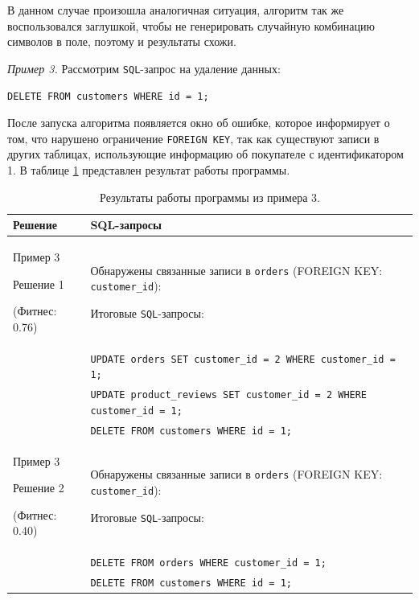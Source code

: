 \documentclass[master,paper]{pmk-graduate}
\begin{document}
В данном случае произошла аналогичная ситуация, алгоритм так же воспользовался заглушкой, чтобы не генерировать случайную комбинацию символов в поле, поэтому и результаты схожи.

\textit{Пример 3.} Рассмотрим \texttt{SQL}-запрос на удаление данных:

\texttt{DELETE FROM customers WHERE id = 1;}

После запуска алгоритма появляется окно об ошибке, которое информи\-рует о том, что нарушено ограничение \texttt{FOREIGN KEY}, так как существуют записи в других таблицах, использующие информацию об покупателе с идентификатором 1. В таблице \ref{table3} представлен результат работы программы.
	
\begin{table}
	\centering
	\begin{tabularx}{\linewidth}{@{}>{\hsize=0.5\hsize}X>{\hsize=1.5\hsize}X@{}}
		\toprule
		\textbf{Решение} & \textbf{SQL-запросы} \\
		\midrule
		Пример 3
		
		Решение 1 
		
		(Фитнес: 0.76) & 
		Обнаружены связанные записи в \texttt{orders} (FOREIGN KEY: \texttt{customer\_id}):
		
		Итоговые \texttt{SQL}-запросы: \\
		& \texttt{UPDATE orders SET customer\_id = 2 WHERE customer\_id = 1;} \\
		& \texttt{UPDATE product\_reviews SET customer\_id = 2 WHERE customer\_id = 1;} \\
		& \texttt{DELETE FROM customers WHERE id = 1;} \\
		\cmidrule{1-2}
		Пример 3
		
		Решение 2 
		
		(Фитнес: 0.40) & 
		Обнаружены связанные записи в \texttt{orders} (FOREIGN KEY: \texttt{customer\_id}):
		
		Итоговые \texttt{SQL}-запросы: \\
		& \texttt{DELETE FROM orders WHERE customer\_id = 1;} \\
		& \texttt{DELETE FROM customers WHERE id = 1;} \\
		\bottomrule
	\end{tabularx}
	\caption{Результаты работы программы из примера 3.}
	\label{table3}
\end{table}
\end{document}

